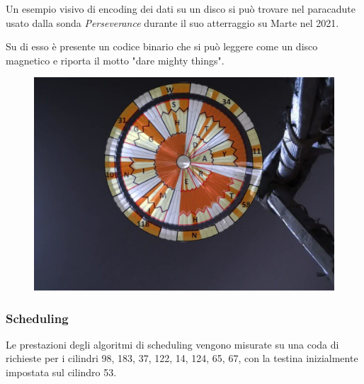 \begin{note}
    Un esempio visivo di encoding dei dati su un disco si può trovare nel paracadute usato dalla sonda \textit{Perseverance} durante il suo atterraggio su Marte nel 2021.

    Su di esso è presente un codice binario che si può leggere come un disco magnetico e riporta il motto "dare mighty things".

    \begin{figure}[H]
        \centering
        \includegraphics[width=0.6\linewidth]{assets/perseverance.jpg}
    \end{figure}
\end{note}

\subsubsection{Scheduling}
Le prestazioni degli algoritmi di scheduling vengono misurate su una coda di richieste per i cilindri 98, 183, 37, 122, 14, 124, 65, 67, con la testina inizialmente impostata sul cilindro 53.

